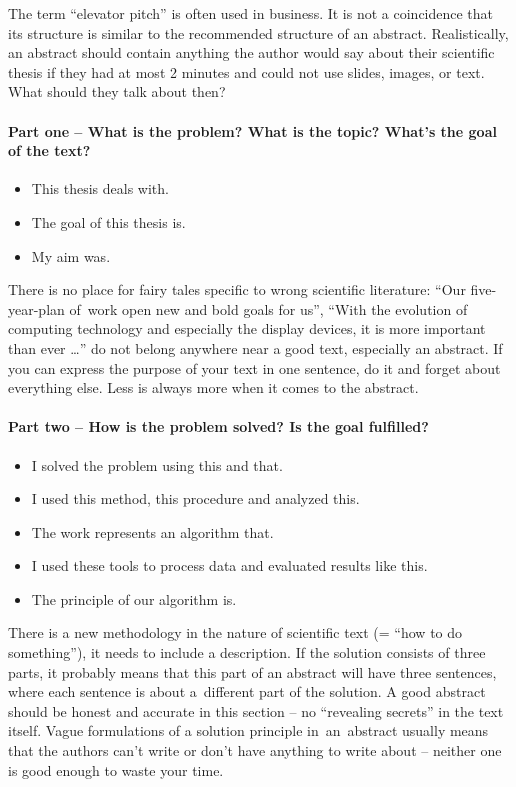 The term ``elevator pitch'' is often used in business. It is not a coincidence that its structure is similar to the recommended structure of an abstract. Realistically, an abstract should contain anything the author would say about their scientific thesis if they had at most 2 minutes and could not use slides, images, or text. What should they talk about then?

\paragraph{Part one -- What is the problem? What is the topic? What's the goal of the text?}
\begin{itemize}
  \item{This thesis deals with.}
  \item{The goal of this thesis is.}
  \item{My aim was.}
\end{itemize}
There is no place for fairy tales specific to wrong scientific literature: ``Our five-year-plan of~work open new and bold goals for us'', ``With the evolution of computing technology and especially the display devices, it is more important than ever \ldots'' do not belong anywhere near a good text, especially an abstract. If you can express the purpose of your text in one sentence, do it and forget about everything else. Less is always more when it comes to the abstract.

\paragraph{Part two -- How is the problem solved? Is the goal fulfilled?}
\begin{itemize}
  \item{I solved the problem using this and that.}
  \item{I used this method, this procedure and analyzed this.}
  \item{The work represents an algorithm that.}
  \item{I used these tools to process data and evaluated results like this.}
  \item{The principle of our algorithm is.}
\end{itemize}

There is a new methodology in the nature of scientific text (= ``how to do something''), it needs to include a description. If the solution consists of three parts, it probably means that this part of an abstract will have three sentences, where each sentence is about a~different part of the solution. A good abstract should be honest and accurate in this section -- no ``revealing secrets'' in the text itself. Vague formulations of a solution principle in~an~abstract usually means that the authors can't write or don't have anything to write about -- neither one is good enough to waste your time.

